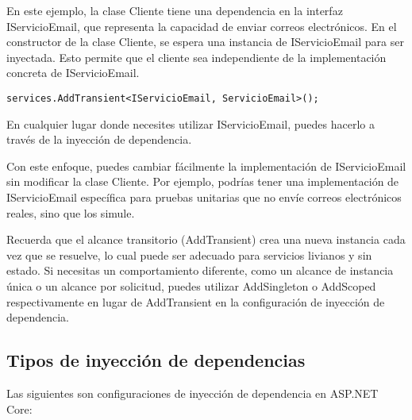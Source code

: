 \documentclass[executivepaper]{article}
\begin{document}
En este ejemplo, la clase Cliente tiene una dependencia en la interfaz IServicioEmail, que representa la capacidad de enviar correos electrónicos. En el constructor de la clase Cliente, se espera una instancia de IServicioEmail para ser inyectada. Esto permite que el cliente sea independiente de la implementación concreta de IServicioEmail.


\begin{lstlisting}
services.AddTransient<IServicioEmail, ServicioEmail>();
\end{lstlisting}

En cualquier lugar donde necesites utilizar IServicioEmail, puedes hacerlo a través de la inyección de dependencia.

Con este enfoque, puedes cambiar fácilmente la implementación de IServicioEmail sin modificar la clase Cliente. Por ejemplo, podrías tener una implementación de IServicioEmail específica para pruebas unitarias que no envíe correos electrónicos reales, sino que los simule.

Recuerda que el alcance transitorio (AddTransient) crea una nueva instancia cada vez que se resuelve, lo cual puede ser adecuado para servicios livianos y sin estado. Si necesitas un comportamiento diferente, como un alcance de instancia única o un alcance por solicitud, puedes utilizar AddSingleton o AddScoped respectivamente en lugar de AddTransient en la configuración de inyección de dependencia.

\subsection*{Tipos de inyección de dependencias}

Las siguientes son configuraciones de inyección de dependencia en ASP.NET Core:
\end{document}
